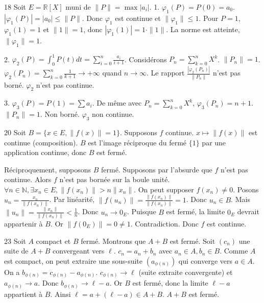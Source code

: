 \begin{correction}{18}
 Soit $E = \mathbb{R}[X]$ muni de $\|P\| = \max |a_{i}|$.
1. $\varphi_{1}(P) = P(0) = a_{0}$.
$|\varphi_{1}(P)| = |a_{0}| \le \|P\|$. Donc $\varphi_{1}$ est continue et $\|\varphi_{1}\| \le 1$.
Pour $P=1$, $\varphi_{1}(1)=1$ et $\|1\|=1$, donc $|\varphi_{1}(1)| = 1 \cdot \|1\|$.
La norme est atteinte, $\|\varphi_{1}\| = 1$.

2. $\varphi_{2}(P) = \int_{0}^{1} P(t) dt = \sum_{i=0}^{n} \frac{a_{i}}{i+1}$.
Considérons $P_{n} = \sum_{k=0}^{n} X^{k}$. $\|P_{n}\| = 1$.
$\varphi_{2}(P_{n}) = \sum_{k=0}^{n} \frac{1}{k+1} \to +\infty$ quand $n \to \infty$.
Le rapport $\frac{|\varphi_{2}(P_{n})|}{\|P_{n}\|}$ n'est pas borné.
$\varphi_{2}$ n'est pas continue.

3. $\varphi_{3}(P) = P(1) = \sum a_{i}$.
De même avec $P_{n} = \sum_{k=0}^{n} X^{k}$, $\varphi_{3}(P_{n}) = n+1$.
$\|P_{n}\| = 1$. Non borné. $\varphi_{3}$ non continue.
\end{correction}

\begin{correction}{20}
 Soit $B = \{x \in E, \|f(x)\| = 1\}$.
Supposons $f$ continue. $x \mapsto \|f(x)\|$ est continue (composition).
$B$ est l'image réciproque du fermé $\{1\}$ par une application continue, donc $B$ est fermé.

Réciproquement, supposons $B$ fermé. Supposons par l'absurde que $f$ n'est pas continue.
Alors $f$ n'est pas bornée sur la boule unité.
$\forall n \in \mathbb{N}, \exists x_{n} \in E, \|f(x_{n})\| > n \|x_{n}\|$.
On peut supposer $f(x_{n}) \neq 0$.
Posons $u_{n} = \frac{x_{n}}{\|f(x_{n})\|}$.
Par linéarité, $\|f(u_{n})\| = \frac{\|f(x_{n})\|}{\|f(x_{n})\|} = 1$. Donc $u_{n} \in B$.
Mais $\|u_{n}\| = \frac{\|x_{n}\|}{\|f(x_{n})\|} < \frac{1}{n}$.
Donc $u_{n} \to 0_{E}$.
Puisque $B$ est fermé, la limite $0_{E}$ devrait appartenir à $B$.
Or $\|f(0_{E})\| = 0 \neq 1$. Contradiction.
Donc $f$ est continue.
\end{correction}

\begin{correction}{23}
Soit $A$ compact et $B$ fermé. Montrons que $A+B$ est fermé.
Soit $(c_{n})$ une suite de $A+B$ convergeant vers $\ell$.
$c_{n} = a_{n} + b_{n}$ avec $a_{n} \in A, b_{n} \in B$.
Comme $A$ est compact, on peut extraire une sous-suite $(a_{\phi(n)})$ qui converge vers $a \in A$.
On a $b_{\phi(n)} = c_{\phi(n)} - a_{\phi(n)}$.
$c_{\phi(n)} \to \ell$ (suite extraite convergente) et $a_{\phi(n)} \to a$.
Donc $b_{\phi(n)} \to \ell - a$.
Or $B$ est fermé, donc la limite $\ell - a$ appartient à $B$.
Ainsi $\ell = a + (\ell - a) \in A + B$.
$A+B$ est fermé.
\end{correction}

